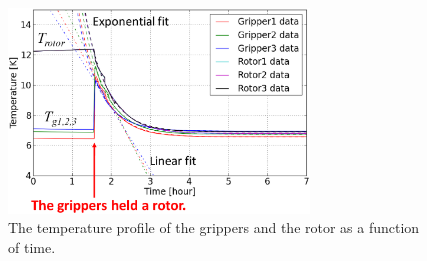 \documentclass[iournal]{IEEEtran}
\begin{document}
\begin{figure}[htb]
   \centering
   \includegraphics[width=80mm]{TemperatureEstimate_rev.eps} %
   \caption{The temperature profile of the grippers and the rotor as a function of time. }
   \label{fig:TemperatureEstimate}
\end{figure}
\end{document}
